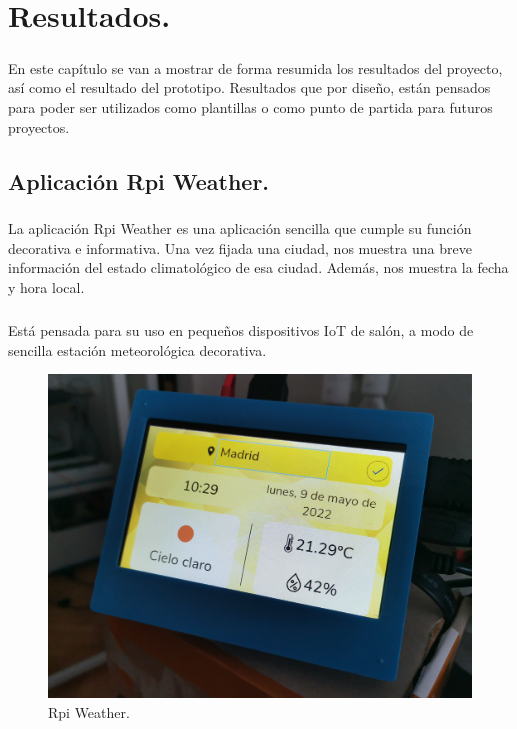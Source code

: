 \chapter{Resultados.}\label{sec:resultados}

\paragraph{}En este capítulo se van a mostrar de forma resumida los resultados del proyecto,
así como el resultado del prototipo. Resultados que por diseño, están pensados para
poder ser utilizados como plantillas o como punto de partida para futuros proyectos.

\section{Aplicación Rpi Weather.}\label{sec:rpiweather}

\paragraph{}La aplicación Rpi Weather es una aplicación sencilla que cumple su función
decorativa e informativa. Una vez fijada una ciudad, nos muestra una breve información
del estado climatológico de esa ciudad. Además, nos muestra la fecha y hora local.

\paragraph{}Está pensada para su uso en pequeños dispositivos IoT de salón, a modo de
sencilla estación meteorológica decorativa.

\begin{figure}[H]
	\centering
	\includegraphics[width=0.70\linewidth]{imgs/app1}
	\caption[Rpi Weather]{Rpi Weather.}
	\label{img:rpi-weather-app}
\end{figure}

